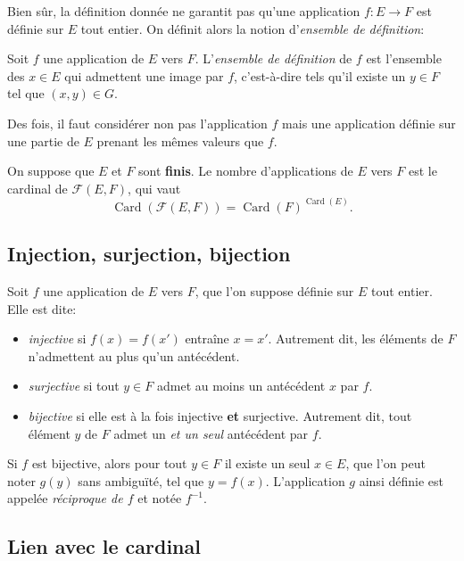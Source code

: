 \documentclass[11pt]{article}
\DeclareMathOperator{\Card}{\mathrm{Card}}
\theoremstyle{definition}
\theoremstyle{remark}
\begin{document}
Bien sûr, la définition donnée ne garantit pas qu'une application $f:E\longrightarrow F$ est définie sur $E$ tout entier. On définit alors la notion d'\textit{ensemble de définition}:

\begin{defn}
	Soit $f$ une application de $E$ vers $F$. L'\textit{ensemble de définition} de $f$ est l'ensemble des $x\in E$ qui admettent une image par $f$, c'est-à-dire tels qu'il existe un $y\in F$ tel que $(x,y)\in G$.
\end{defn}

Des fois, il faut considérer non pas l'application $f$ mais une application définie sur une partie de $E$ prenant les mêmes valeurs que $f$.

\begin{prop}
	On suppose que $E$ et $F$ sont \textbf{finis}. Le nombre d'applications de $E$ vers $F$ est le cardinal de $\mathcal F(E,F)$, qui vaut
	\[
	\Card(\mathcal{F}(E,F)) = \Card(F)^{\Card(E)}.
	\]
\end{prop}

\subsection{Injection, surjection, bijection}

\begin{defn}
	Soit $f$ une application de $E$ vers $F$, que l'on suppose définie sur $E$ tout entier. Elle est dite:
	\begin{itemize}
		\item \textit{injective} si $f(x)=f(x')$ entraîne $x= x'$. Autrement dit, les éléments de $F$ n'admettent au plus qu'un antécédent.
		\item \textit{surjective} si tout $y\in F$ admet au moins un antécédent $x$ par $f$.
		\item \textit{bijective} si elle est à la fois injective \textbf{et} surjective. Autrement dit, tout élément $y$ de $F$ admet un \textit{et un seul} antécédent par $f$.
	\end{itemize}
\end{defn}

Si $f$ est bijective, alors pour tout $y\in F$ il existe un seul $x\in E$, que l'on peut noter $g(y)$ sans ambiguïté, tel que $y=f(x)$. L'application $g$ ainsi définie est appelée \textit{réciproque de $f$} et notée $f^{-1}$.


\subsection{Lien avec le cardinal}
\end{document}
